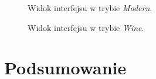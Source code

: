 \documentclass[twoside,a4paper]{book}
\begin{document}
				 \begin{figure}
		\centering
		\caption{Widok interfejsu w trybie \textit{Modern}.}
		\label{fig:modern}
		\end{figure}
		 \begin{figure}
		\centering
		\caption{Widok interfejsu w trybie \textit{Wine}.}
		\label{fig:wine}
		\end{figure}
\section{Podsumowanie}

 
\end{document}
